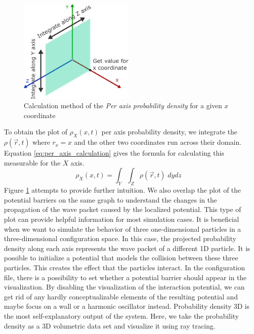 \begin{figure}
	\centering
	\includegraphics[width=0.5\textwidth]{figures/per_axis_plot_explained.pdf}
	\caption{Calculation method of the \textit{Per axis probability density} for a given $x$ coordinate}
	\label{fig:per_axis_explained}
\end{figure}
To obtain the plot of $\rho_X(x, t)$ per axis probability density, we integrate the $\rho(\vec{r}, t)$ where $r_x = x$ and the other two coordinates run across their domain.
Equation \ref{eq:per_axis_calculation} gives the formula for calculating this measurable for the $X$ axis.
\begin{equation}
	\rho_X(x, t) = \int_Y \int_Z \rho(\vec{r}, t)\; dy dz
	\label{eq:per_axis_calculation}
\end{equation}
Figure \ref{fig:per_axis_explained} attempts to provide further intuition.
We also overlap the plot of the potential barriers on the same graph to understand the changes in the propagation of the wave packet caused by the localized potential.
This type of plot can provide helpful information for most simulation cases. It is beneficial when we want to simulate the behavior of three one-dimensional particles in a three-dimensional configuration space.
In this case, the projected probability density along each axis represents the wave packet of a different 1D particle.
It is possible to initialize a potential that models the collision between these three particles.
This creates the effect that the particles interact.
In the configuration file, there is a possibility to set whether a potential barrier should appear in the visualization.
By disabling the visualization of the interaction potential, we can get rid of any hardly conceptualizable elements of the resulting potential and maybe focus on a wall or a harmonic oscillator instead.
Probability density 3D is the most self-explanatory output of the system.
Here, we take the probability density as a 3D volumetric data set and visualize it using ray tracing.
